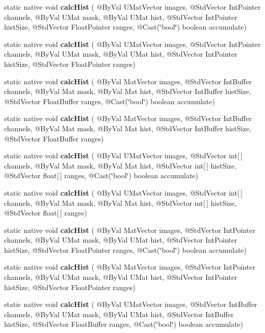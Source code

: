 \begin{DoxyCompactItemize}
static native void {\bfseries calc\+Hist} ( @By\+Val U\+Mat\+Vector images, @Std\+Vector Int\+Pointer channels, @By\+Val U\+Mat mask, @By\+Val U\+Mat hist, @Std\+Vector Int\+Pointer hist\+Size, @Std\+Vector Float\+Pointer ranges, @Cast(\char`\"{}bool\char`\"{}) boolean accumulate)
\item 
static native void {\bfseries calc\+Hist} ( @By\+Val U\+Mat\+Vector images, @Std\+Vector Int\+Pointer channels, @By\+Val U\+Mat mask, @By\+Val U\+Mat hist, @Std\+Vector Int\+Pointer hist\+Size, @Std\+Vector Float\+Pointer ranges)
\item 
static native void {\bfseries calc\+Hist} ( @By\+Val Mat\+Vector images, @Std\+Vector Int\+Buffer channels, @By\+Val Mat mask, @By\+Val Mat hist, @Std\+Vector Int\+Buffer hist\+Size, @Std\+Vector Float\+Buffer ranges, @Cast(\char`\"{}bool\char`\"{}) boolean accumulate)
\item 
static native void {\bfseries calc\+Hist} ( @By\+Val Mat\+Vector images, @Std\+Vector Int\+Buffer channels, @By\+Val Mat mask, @By\+Val Mat hist, @Std\+Vector Int\+Buffer hist\+Size, @Std\+Vector Float\+Buffer ranges)
\item 
static native void {\bfseries calc\+Hist} ( @By\+Val U\+Mat\+Vector images, @Std\+Vector int\mbox{[}$\,$\mbox{]} channels, @By\+Val Mat mask, @By\+Val Mat hist, @Std\+Vector int\mbox{[}$\,$\mbox{]} hist\+Size, @Std\+Vector float\mbox{[}$\,$\mbox{]} ranges, @Cast(\char`\"{}bool\char`\"{}) boolean accumulate)
\item 
static native void {\bfseries calc\+Hist} ( @By\+Val U\+Mat\+Vector images, @Std\+Vector int\mbox{[}$\,$\mbox{]} channels, @By\+Val Mat mask, @By\+Val Mat hist, @Std\+Vector int\mbox{[}$\,$\mbox{]} hist\+Size, @Std\+Vector float\mbox{[}$\,$\mbox{]} ranges)
\item 
static native void {\bfseries calc\+Hist} ( @By\+Val Mat\+Vector images, @Std\+Vector Int\+Pointer channels, @By\+Val U\+Mat mask, @By\+Val U\+Mat hist, @Std\+Vector Int\+Pointer hist\+Size, @Std\+Vector Float\+Pointer ranges, @Cast(\char`\"{}bool\char`\"{}) boolean accumulate)
\item 
static native void {\bfseries calc\+Hist} ( @By\+Val Mat\+Vector images, @Std\+Vector Int\+Pointer channels, @By\+Val U\+Mat mask, @By\+Val U\+Mat hist, @Std\+Vector Int\+Pointer hist\+Size, @Std\+Vector Float\+Pointer ranges)
\item 
static native void {\bfseries calc\+Hist} ( @By\+Val U\+Mat\+Vector images, @Std\+Vector Int\+Buffer channels, @By\+Val U\+Mat mask, @By\+Val U\+Mat hist, @Std\+Vector Int\+Buffer hist\+Size, @Std\+Vector Float\+Buffer ranges, @Cast(\char`\"{}bool\char`\"{}) boolean accumulate)

\end{DoxyCompactItemize}
